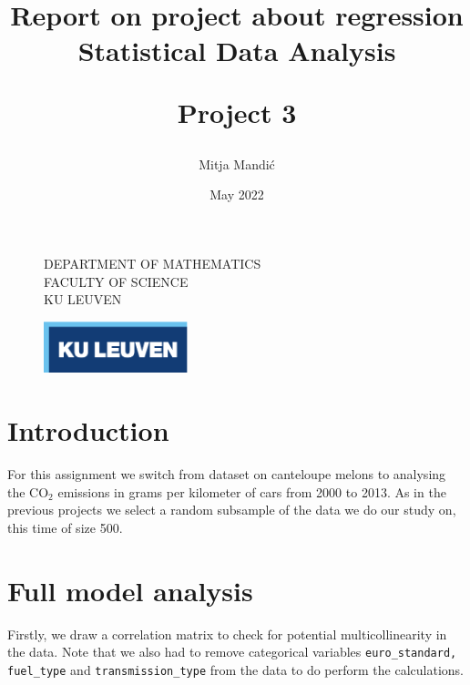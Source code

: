 \documentclass[12pt]{article}
\title{\vspace*{40.0mm}
  \bf Report on project about regression
         \vspace*{20.0mm} \\
  \Large\bf Statistical Data Analysis 
  
 
  
  Project 3 \vspace*{20.0mm}
  \vspace*{40.0mm}}
\author{Mitja Mandić}
\date{ May 2022}
\makeatletter
\def\cleardoublepage{\clearpage\if@twoside \ifodd\c@page\else%
\hbox{}%
\thispagestyle{empty}%
\clearpage%
\if@twocolumn\hbox{}\clearpage\fi\fi\fi}
\makeatother
\begin{document}
\begin{figure}
  \parbox[t]{125mm}{
    \vspace*{6mm}
    \scriptsize\sf           DEPARTMENT OF MATHEMATICS \\
    \scriptsize\sf           FACULTY OF SCIENCE\\
    \scriptsize\sf           KU LEUVEN}
  \parbox[t]{40mm}{
    \begin{flushright}
      \includegraphics[height=15mm]{../images/logo.eps.pdf}
    \end{flushright}}
\end{figure}

\maketitle
\thispagestyle{empty}
\raggedbottom

\cleardoublepage
{}
\setcounter{tocdepth}{2}
{}

\section{Introduction}
For this assignment we switch from dataset on canteloupe melons to analysing the $\text{CO}_{2}$ emissions in grams per kilometer
of cars from 2000 to 2013. As in the previous projects we select a random subsample of the data we do our study on, this time of size 500.

\section{Full model analysis}\label{fullModel}
Firstly, we draw a correlation matrix to check for potential multicollinearity in the data. Note that we also had to remove categorical
variables \texttt{euro\_standard, fuel\_type} and \texttt{transmission\_type} from the data to do perform the calculations.
\end{document}
